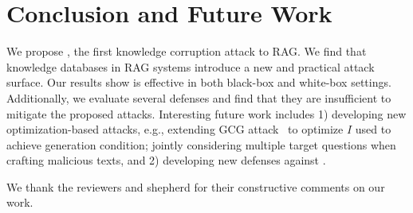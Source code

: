 \vspace{-3mm}
\section{Conclusion and Future Work}
\vspace{-3mm}
We propose {\name}, the first knowledge corruption attack to RAG. We find that knowledge databases in RAG systems introduce a new and practical attack surface.  
Our results show {\name} is effective in both black-box and white-box settings. Additionally, we evaluate several defenses and find that they are insufficient to mitigate the proposed attacks. Interesting future work includes 1) developing new optimization-based attacks, e.g., extending GCG attack~\cite{zou2023universal} to optimize $I$ used to achieve generation condition; jointly considering multiple target questions when crafting malicious texts, and 2) developing new defenses against {\name}.

\vspace{2mm}
We thank the reviewers and shepherd for their constructive comments on our work.

